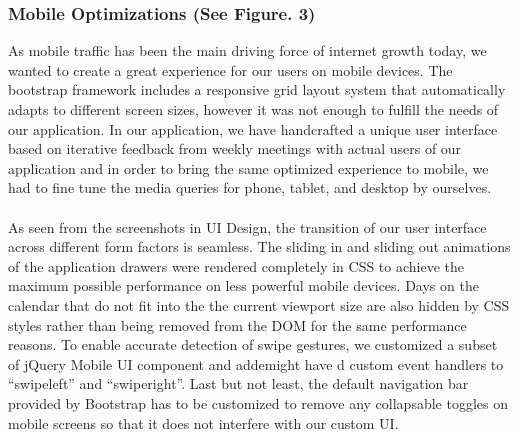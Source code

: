 \documentclass[10pt,a4paper]{article}
\begin{document}
\subsubsection{Mobile Optimizations (See Figure. 3)}
As mobile traffic has been the main driving force of internet growth today, we wanted to create a great experience for our users on mobile devices. The bootstrap framework includes a responsive grid layout system that automatically adapts to different screen sizes, however it was not enough to fulfill the needs of our application. In our application, we have handcrafted a unique user interface based on iterative feedback from weekly meetings with actual users of our application and in order to bring the same optimized experience to mobile, we had to fine tune the media queries for phone, tablet, and desktop by ourselves.
\\
\\
\noindent As seen from the screenshots in UI Design, the transition of our user interface across different form factors is seamless. The sliding in and sliding out animations of the application drawers were rendered completely in CSS to achieve the maximum possible performance on less powerful mobile devices. Days on the calendar that do not fit into the the current viewport size are also hidden by CSS styles rather than being removed from the DOM for the same performance reasons. To enable accurate detection of swipe gestures, we customized a subset of jQuery Mobile UI component and addemight have d custom event handlers to “swipeleft” and “swiperight”. Last but not least, the default navigation bar provided by Bootstrap has to be customized to remove any collapsable toggles on mobile screens so that it does not interfere with our custom UI.
\end{document}
